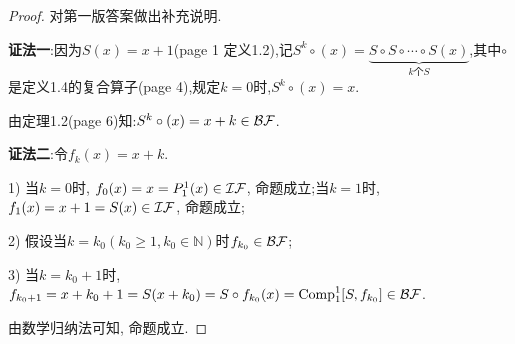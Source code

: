 \begin{proof}{\color {red} {对第一版答案做出补充说明.}}

\textbf{证法一}:因为$S(x)=x+1$(page 1 定义1.2),记$S^k \circ (x) = \underbrace{S\circ S \circ \cdots \circ S(x)}_{k\text{个}S}$,其中$\circ$是定义1.4的复合算子(page 4),规定$k=0$时,$S^k \circ (x)=x$.

由定理1.2(page 6)知:$S^k \circ (x)=x+k \in \mathcal{BF}$.

\hspace*{\fill}

\textbf{证法二}:令$f_k(x)=x+k$.

1) 当$k=0$时, $f_0(x)=x=P_1^1(x)\in\mathcal{IF}$, 命题成立;当$k=1$时, $f_1(x)=x+1=S(x)\in\mathcal{IF}$, 命题成立;

2) 假设当$k=k_0(k_0\geqslant 1,k_0\in\mathbb{N})$时$f_{k_0}\in\mathcal{BF}$;

3) 当$k=k_0+1$时,$f_{k_0+1}=x+k_0+1=S(x+k_0)=S\circ f_{k_0}(x)=\mathrm{Comp}^1_1[S,f_{k_0}]\in\mathcal{BF}$.


由数学归纳法可知, 命题成立.
\end{proof}